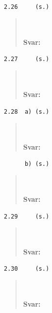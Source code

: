 \documentclass[a4paper]{article}
\newcommand{\tskcol}[1]{\textcolor{tskcol}{#1}}
\begin{document}
\texttt{\tskcol{2.26~~~~ (s.)}}
\begin{quotation}
	\noindent
	\\ \\
	\textbf{Svar:}
\end{quotation}

\texttt{\tskcol{2.27~~~~ (s.)}}
\begin{quotation}
	\noindent
	\\ \\
	\textbf{Svar:}
\end{quotation}

\texttt{\tskcol{2.28~~a) (s.)}}
\begin{quotation}
	\noindent
	\\ \\
	\textbf{Svar:}
\end{quotation}

\texttt{\tskcol{~~~~~~b) (s.)}}
\begin{quotation}
	\noindent
	\\ \\
	\textbf{Svar:}
\end{quotation}

\texttt{\tskcol{2.29~~~~ (s.)}}
\begin{quotation}
	\noindent
	\\ \\
	\textbf{Svar:}
\end{quotation}

\texttt{\tskcol{2.30~~~~ (s.)}}
\begin{quotation}
	\noindent
	\\ \\
	\textbf{Svar:}
\end{quotation}
\end{document}
